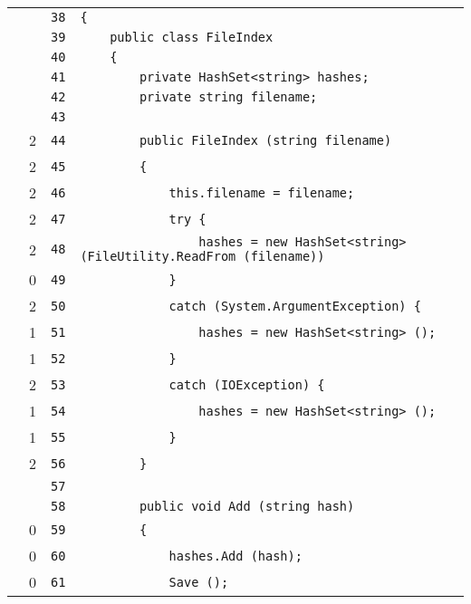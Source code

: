 \documentclass[a4paper,10pt]{article}
\begin{document}
\begin{longtable}[l]{lrrl}
\cellcolor{gray} &  & \verb~38~ & \verb~{~\\
\cellcolor{gray} &  & \verb~39~ & \verb~    public class FileIndex~\\
\cellcolor{gray} &  & \verb~40~ & \verb~    {~\\
\cellcolor{gray} &  & \verb~41~ & \verb~        private HashSet<string> hashes;~\\
\cellcolor{gray} &  & \verb~42~ & \verb~        private string filename;~\\
\cellcolor{gray} &  & \verb~43~ & \verb~~\\
\cellcolor{green} & 2 & \verb~44~ & \verb~        public FileIndex (string filename)~\\
\cellcolor{green} & 2 & \verb~45~ & \verb~        {~\\
\cellcolor{green} & 2 & \verb~46~ & \verb~            this.filename = filename;~\\
\cellcolor{green} & 2 & \verb~47~ & \verb~            try {~\\
\cellcolor{green} & 2 & \verb~48~ & \verb~                hashes = new HashSet<string> (FileUtility.ReadFrom (filename))~\\
\cellcolor{red} & 0 & \verb~49~ & \verb~            }~\\
\cellcolor{green} & 2 & \verb~50~ & \verb~            catch (System.ArgumentException) {~\\
\cellcolor{green} & 1 & \verb~51~ & \verb~                hashes = new HashSet<string> ();~\\
\cellcolor{green} & 1 & \verb~52~ & \verb~            }~\\
\cellcolor{green} & 2 & \verb~53~ & \verb~            catch (IOException) {~\\
\cellcolor{green} & 1 & \verb~54~ & \verb~                hashes = new HashSet<string> ();~\\
\cellcolor{green} & 1 & \verb~55~ & \verb~            }~\\
\cellcolor{green} & 2 & \verb~56~ & \verb~        }~\\
\cellcolor{gray} &  & \verb~57~ & \verb~~\\
\cellcolor{gray} &  & \verb~58~ & \verb~        public void Add (string hash)~\\
\cellcolor{red} & 0 & \verb~59~ & \verb~        {~\\
\cellcolor{red} & 0 & \verb~60~ & \verb~            hashes.Add (hash);~\\
\cellcolor{red} & 0 & \verb~61~ & \verb~            Save ();~\\

\end{longtable}
\end{document}
